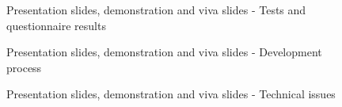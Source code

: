 \documentclass[a4paper]{article}
\begin{document}
\begin{appendices}
\begin{figure}[h!]
		\caption{Presentation slides, demonstration and viva slides - Tests and questionnaire results}
	\end{figure}
	\newpage
	\begin{figure}[h!]
		\caption{Presentation slides, demonstration and viva slides - Development process}
	\end{figure}
	\begin{figure}[h!]
		\caption{Presentation slides, demonstration and viva slides - Technical issues}
	\end{figure}
	\newpage
	\begin{figure}[h!]

\end{figure}
\end{appendices}
\end{document}
